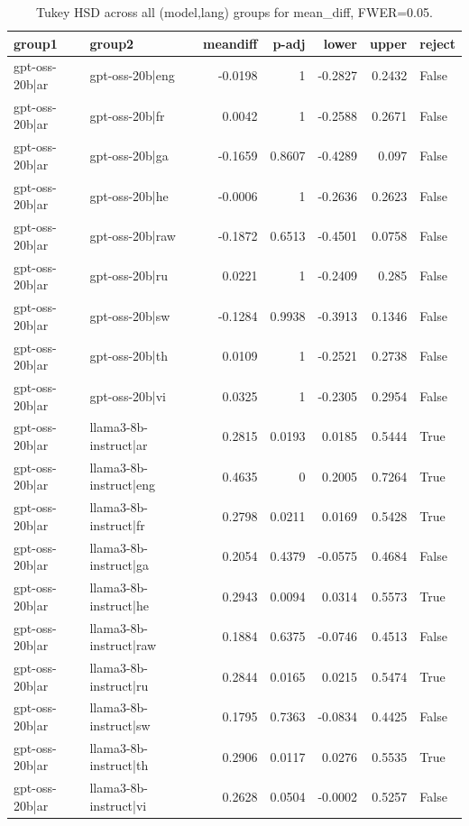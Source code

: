 \begin{table}
\caption{Tukey HSD across all (model,lang) groups for mean_diff, FWER=0.05.}
\label{tab:tukey_all_models_all_langs_mean_diff}
\begin{tabular}{l l r r r r l}
\toprule
group1 & group2 & meandiff & p-adj & lower & upper & reject \\
\midrule
gpt-oss-20b|ar & gpt-oss-20b|eng & -0.0198 & 1 & -0.2827 & 0.2432 & False \\
gpt-oss-20b|ar & gpt-oss-20b|fr & 0.0042 & 1 & -0.2588 & 0.2671 & False \\
gpt-oss-20b|ar & gpt-oss-20b|ga & -0.1659 & 0.8607 & -0.4289 & 0.097 & False \\
gpt-oss-20b|ar & gpt-oss-20b|he & -0.0006 & 1 & -0.2636 & 0.2623 & False \\
gpt-oss-20b|ar & gpt-oss-20b|raw & -0.1872 & 0.6513 & -0.4501 & 0.0758 & False \\
gpt-oss-20b|ar & gpt-oss-20b|ru & 0.0221 & 1 & -0.2409 & 0.285 & False \\
gpt-oss-20b|ar & gpt-oss-20b|sw & -0.1284 & 0.9938 & -0.3913 & 0.1346 & False \\
gpt-oss-20b|ar & gpt-oss-20b|th & 0.0109 & 1 & -0.2521 & 0.2738 & False \\
gpt-oss-20b|ar & gpt-oss-20b|vi & 0.0325 & 1 & -0.2305 & 0.2954 & False \\
gpt-oss-20b|ar & llama3-8b-instruct|ar & 0.2815 & 0.0193 & 0.0185 & 0.5444 & True \\
gpt-oss-20b|ar & llama3-8b-instruct|eng & 0.4635 & 0 & 0.2005 & 0.7264 & True \\
gpt-oss-20b|ar & llama3-8b-instruct|fr & 0.2798 & 0.0211 & 0.0169 & 0.5428 & True \\
gpt-oss-20b|ar & llama3-8b-instruct|ga & 0.2054 & 0.4379 & -0.0575 & 0.4684 & False \\
gpt-oss-20b|ar & llama3-8b-instruct|he & 0.2943 & 0.0094 & 0.0314 & 0.5573 & True \\
gpt-oss-20b|ar & llama3-8b-instruct|raw & 0.1884 & 0.6375 & -0.0746 & 0.4513 & False \\
gpt-oss-20b|ar & llama3-8b-instruct|ru & 0.2844 & 0.0165 & 0.0215 & 0.5474 & True \\
gpt-oss-20b|ar & llama3-8b-instruct|sw & 0.1795 & 0.7363 & -0.0834 & 0.4425 & False \\
gpt-oss-20b|ar & llama3-8b-instruct|th & 0.2906 & 0.0117 & 0.0276 & 0.5535 & True \\
gpt-oss-20b|ar & llama3-8b-instruct|vi & 0.2628 & 0.0504 & -0.0002 & 0.5257 & False \\

\end{tabular}
\end{table}

